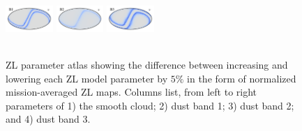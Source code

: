 \documentclass[twocolumn]{aa}
\begin{document}
\begin{figure}[hbt]
{    \includegraphics[height=1cm]{figs/atlas/B1_09.pdf}%
    \includegraphics[height=1cm]{figs/atlas/B2_09.pdf}%
    \includegraphics[height=1cm]{figs/atlas/B3_09.pdf}%
    }\\
    \\
   
    \caption{ZL parameter atlas showing the difference between increasing 
    and lowering each ZL model parameter by $5\%$ in the form of normalized 
    mission-averaged ZL maps. Columns list, from left to right parameters of
    1) the smooth cloud; 2) dust band 1; 3) dust band 2; and 4) dust band 3.}
    \label{fig:atlas1}
\end{figure}
\end{document}
